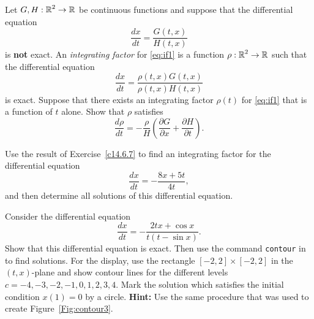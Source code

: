 \documentclass{ximera}
\begin{document}
\begin{exercise} \label{c14.6.7}
Let $G,H:\mbox{$\Bbb{R}$}^2\to\mbox{$\Bbb{R}$}$ be continuous functions and suppose that the differential 
equation 
\begin{equation}  \label{eq:if1}
\frac{dx}{dt} = \frac{G(t,x)}{H(t,x)}
\end{equation}
is {\bf not} exact.   An {\em integrating factor\/} for \eqref{eq:if1} is 
a function $\rho:\mbox{$\Bbb{R}$}^2\rightarrow\mbox{$\Bbb{R}$}$ such that the differential equation
\[
\frac{dx}{dt} = \frac{\rho(t,x) G(t,x)}{\rho(t,x)H(t,x)}
\]
is exact.  Suppose that there exists an integrating factor $\rho(t)$ for 
\eqref{eq:if1} that is a function of $t$ alone.  Show that $\rho$ satisfies
\[
\frac{d\rho}{dt} = -\frac{\rho}{H}
\left( \frac{\partial G}{\partial x}+\frac{\partial H}{\partial t}\right).
\]
\end{exercise}

\begin{exercise} \label{c14.6.7A}
Use the result of Exercise~\ref{c14.6.7} to find an integrating factor for 
the differential equation
\[
\frac{dx}{dt} = -\frac{8x+5t}{4t},
\]
and then determine all solutions of this differential equation.
\end{exercise}

\CEXER


\begin{exercise} \label{c14.6.8}
Consider the differential equation
\[
\frac{dx}{dt} = -\frac{2tx+\cos x}{t(t-\sin x)}.
\]
Show that this differential equation is 
exact.  Then use the command {\tt contour} in \Matlab 
to find solutions.  For the display, 
use the rectangle $[-2,2]\times [-2,2]$ in the $(t,x)$-plane and show contour
lines for the different levels $c=-4,-3,-2,-1,0,1,2,3,4$.  Mark the solution
which satisfies the initial condition $x(1)=0$ by a circle.
{\bf Hint:} Use the same procedure that was used to create 
Figure~\ref{Fig:contour3}.
\end{exercise}
\end{document}
